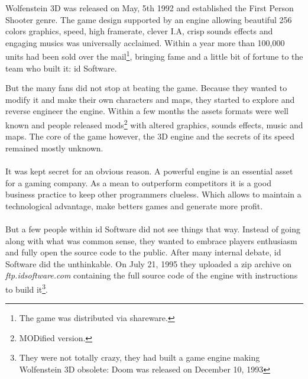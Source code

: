 Wolfenstein 3D was released on May, 5th 1992 and established the First Person Shooter genre. The game design supported by an engine allowing beautiful 256 colors graphics, speed, high framerate, clever I.A, crisp sounds effects and engaging musics was universally acclaimed. Within a year more than 100,000 units had been sold over the mail\footnote{The game was distributed via shareware.}, bringing fame and a little bit of fortune to the team who built it: id Software.\\
\par
\begin{figure}[H]
\centering
{}
\end{figure}
\par
But the many fans did not stop at beating the game. Because they wanted to modify it and make their own characters and maps, they started to explore and reverse engineer the engine. Within a few months the assets formats were well known and people released mods\footnote{MODified version.} with altered graphics, sounds effects, music and maps. The core of the game however, the 3D engine and the secrets of its speed remained mostly unknown.\\
\\
It was kept secret for an obvious reason. A powerful engine is an essential asset for a gaming company. As a mean to outperform competitors it is a good business practice to keep other programmers clueless. Which allows to maintain a technological advantage, make betters games and generate more profit.\\
\\
But a few people within id Software did not see things that way. Instead of going along with what was common sense, they wanted to embrace players enthusiasm and fully open the source code to the public. After many internal debate, id Software did the unthinkable. On July 21, 1995 they uploaded a zip archive on \emph{ftp.idsoftware.com} containing the full source code of the engine with instructions to build it\footnote{They were not totally crazy, they had built a game engine making Wolfenstein 3D obsolete: Doom was released on December 10, 1993}.\\

